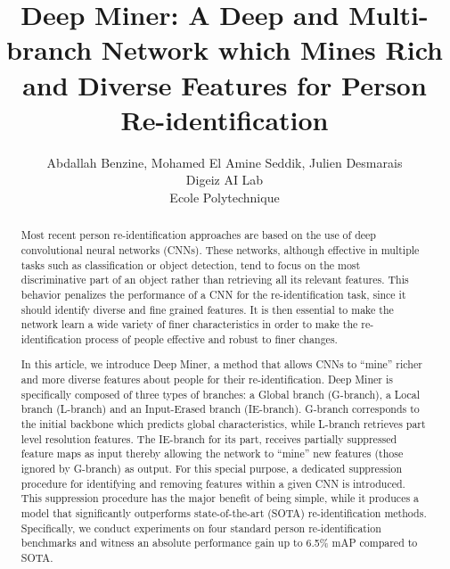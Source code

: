 \documentclass[final]{cvpr}
\begin{document}
\title{Deep Miner: A Deep and Multi-branch Network which Mines Rich\\ and Diverse Features for Person Re-identification}

\author{Abdallah Benzine, Mohamed El Amine Seddik, Julien Desmarais\\
Digeiz AI Lab \\
Ecole Polytechnique\\
}





\maketitle





\begin{abstract}
Most recent person re-identification approaches are based on the use of deep convolutional neural networks (CNNs).  These networks, although effective in multiple tasks such as classification or object detection, tend to focus on the most discriminative part of an object rather than retrieving all its relevant features. This behavior penalizes the performance of a CNN for the re-identification task, since it should identify diverse and fine grained features. It is then essential to make the network learn a wide variety of finer characteristics in order to make the re-identification process of people effective and robust to finer changes. 

In this article, we introduce Deep Miner, a method that allows CNNs to ``mine'' richer and more diverse features about people for their re-identification. Deep Miner is specifically composed of three types of branches: a Global branch (G-branch), a Local branch (L-branch) and an Input-Erased branch (IE-branch). G-branch corresponds to the initial backbone which predicts global characteristics, while L-branch retrieves part level resolution features. The IE-branch for its part, receives partially suppressed feature maps as input thereby allowing the network to ``mine'' new features (those ignored by G-branch) as output. For this special purpose, a dedicated suppression procedure for identifying and removing features within a given CNN is introduced. This suppression procedure has the major benefit of being simple, while it produces a model that significantly outperforms state-of-the-art (SOTA) re-identification methods. Specifically, we conduct experiments on four standard person re-identification benchmarks and witness an absolute performance gain up to 6.5\% mAP compared to SOTA.


\end{abstract}
\end{document}
